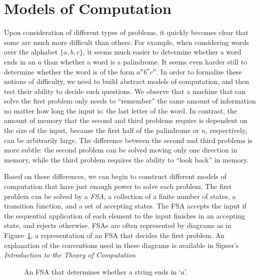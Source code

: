 \documentclass[psamsfonts]{amsart}
\theoremstyle{definition}
\theoremstyle{remark}
\numberwithin{equation}{section}
\begin{document}
\section{Models of Computation}
Upon consideration of different types of problems, it quickly becomes clear that
some are much more difficult than others. For example, when considering words
over the alphabet $\{a,b,c\}$, it seems much easier to determine whether a word
ends in an $a$ than whether a word is a palindrome. It seems even harder still
to determine whether the word is of the form $a^nb^nc^n$. In order to formalize
these notions of difficulty, we need to build abstract models of computation,
and then test their ability to decide such questions. We observe that a machine
that can solve the first problem only needs to ``remember'' the same amount of
information no matter how long the input is: the last letter of the word. In
contrast, the amount of memory that the second and third problems require is
dependent on the size of the input, because the first half of the palindrome or
$n$, respectively, can be arbitrarily large. The difference between the second
and third problems is more subtle: the second problem can be solved moving only
one direction in memory, while the third problem requires the ability to ``look
back'' in memory.
\par
Based on these differences, we can begin to construct different models of
computation that have just enough power to solve each problem. The first problem
can be solved by a \emph{\ac{FSA}}, a collection of a finite
number of states, a transition function, and a set of accepting states. The
\ac{FSA} accepts the input if the sequential application of each element to the
input finishes in an accepting state, and rejects otherwise. \aclp{FSA} are often represented by diagrams as in Figure~\ref{fig:fsa}, a
representation of an \ac{FSA} that decides the first problem. An explanation of
the conventions used in these diagrams is available in Sipser's
\emph{Introduction to the Theory of Computation}~\cite[][pp. 34,114]{sipser13:_introd_theor_comput}
\begin{figure}[h]
  \caption{An \ac{FSA} that determines whether a string ends in
    `$a$'.}
  \label{fig:fsa}
\end{figure}
\end{document}

